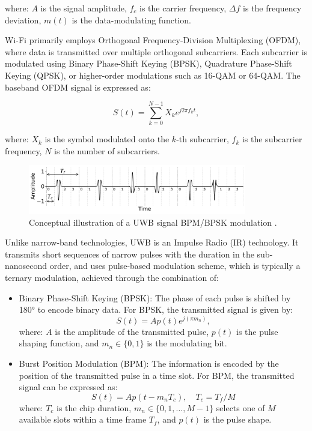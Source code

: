 where: $A$ is the signal amplitude, $f_c$ is the carrier frequency, $\Delta f$ is the frequency deviation, $m(t)$ is the data-modulating function. 


Wi-Fi primarily employs Orthogonal Frequency-Division Multiplexing (OFDM), where data is transmitted over multiple orthogonal subcarriers. Each subcarrier is modulated using Binary Phase-Shift Keying (BPSK), Quadrature Phase-Shift Keying (QPSK), or higher-order modulations such as 16-QAM or 64-QAM. The baseband OFDM signal is expressed as:

\begin{equation}
S(t) = \sum_{k=0}^{N-1} X_k e^{j 2 \pi f_k t},
\end{equation}

where: $X_k$ is the symbol modulated onto the $k$-th subcarrier, $f_k$ is the subcarrier frequency,
$N$ is the number of subcarriers.

\begin{figure}[tbh]
\includegraphics[width=0.85\textwidth]{Graphics/uwb_bpsk.pdf}
\centering
\caption{Conceptual illustration of a UWB signal BPM/BPSK modulation .}
\label{fig:uwb-mod}
\end{figure}

Unlike narrow-band technologies, UWB is an Impulse Radio (IR) technology. It transmits short sequences of narrow pulses with the duration in the sub-nanosecond order, and uses pulse-based modulation scheme, which is typically a ternary modulation, achieved through the combination of:

\begin{itemize}
    \item Binary Phase-Shift Keying (BPSK): The phase of each pulse is shifted by 180° to encode binary data. For BPSK, the transmitted signal is given by:
    \begin{equation}
    S(t) = A p(t) e^{j (\pi m_n)},
    \end{equation}
    where: $A$ is the amplitude of the transmitted pulse, $p(t)$ is the pulse shaping function, and $m_n \in \{0, 1\}$ is the modulating bit.

    \item Burst Position Modulation (BPM): The information is encoded by the position of the transmitted pulse in a time slot. For BPM, the transmitted signal can be expressed as:
    \begin{equation}
    S(t) = A p\left(t - m_n T_c\right), \quad T_c = T_f / M
    \end{equation}
    where: $T_c$ is the chip duration, $m_n \in \{0, 1, \dots, M-1\}$ selects one of $M$ available slots within a time frame $T_f$, and $p(t)$ is the pulse shape.
\end{itemize}

